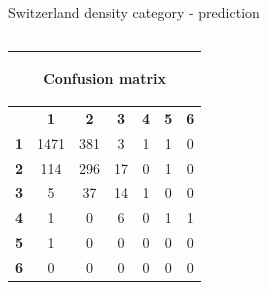 \documentclass[c]{beamer}
\begin{document}
\begin{frame}
\begin{columns}
\begin{column}{0.5\textwidth}
\begin{overlayarea}{\linewidth}{4cm}
  \end{overlayarea}
  \begin{overlayarea}{\linewidth}{0.5cm}
    \centering
    \tiny Switzerland density category - prediction\par
  \end{overlayarea}
 \end{column}
\end{columns}
\begin{columns}
 \begin{column}{0.6\textwidth}
 \begin{overlayarea}{\linewidth}{2cm}
  \begin{table}
  \begin{center}
  \begin{adjustbox}{max width=0.6\textwidth}
  {\tiny
  \begin{tabular}{|c|c|c|c|c|c|c|}
    \hline
    \multicolumn{7}{|c|}{{\tiny \begin{bf}Confusion matrix\end{bf}}} \\
    \hline
     & \textbf{1} & \textbf{2} & \textbf{3} & \textbf{4} & \textbf{5} & \textbf{6}\\
    \hline
    \textbf{1} & 1471 & 381 & 3 & 1 & 1 & 0\\
    \hline
    \textbf{2} & 114 & 296 & 17 & 0 & 1 & 0\\
    \hline
    \textbf{3} & 5 & 37 & 14 & 1 & 0 & 0\\
    \hline
    \textbf{4} & 1 & 0 & 6 & 0 & 1 & 1\\
    \hline
    \textbf{5} & 1 & 0 & 0 & 0 & 0 & 0\\
    \hline
    \textbf{6} & 0 & 0 & 0 & 0 & 0 & 0\\
    \hline
  \end{tabular}
  }
  \end{adjustbox}
  \end{center}
  \end{table}
 \end{overlayarea}
 \end{column}
 \begin{column}{0.6\textwidth}

\end{column}
\end{columns}
\end{frame}
\end{document}
